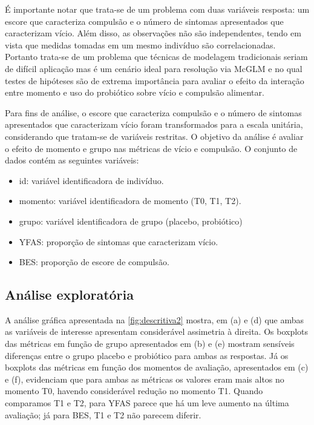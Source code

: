 É importante notar que trata-se de um problema com duas variáveis resposta: um escore que caracteriza compulsão e o número de sintomas apresentados que caracterizam vício. Além disso, as observações não são independentes, tendo em vista que medidas tomadas em um mesmo indivíduo são correlacionadas. Portanto trata-se de um problema que técnicas de modelagem tradicionais seriam de difícil aplicação mas é um cenário ideal para resolução via McGLM e no qual testes de hipóteses são de extrema importância para avaliar o efeito da interação entre momento e uso do probiótico sobre vício e compulsão alimentar.

Para fins de análise, o escore que caracteriza compulsão e o número de sintomas apresentados que caracterizam vício foram transformados para a escala unitária, considerando que tratam-se de variáveis restritas. O objetivo da análise é avaliar o efeito de momento e grupo nas métricas de vício e compulsão. O conjunto de dados contém as seguintes variáveis:

\begin{itemize}
  \item id: variável identificadora de indivíduo.
  \item momento: variável identificadora de momento (T0, T1, T2).
  \item grupo: variável identificadora de grupo (placebo, probiótico)
  \item YFAS: proporção de sintomas que caracterizam vício.
  \item BES: proporção de escore de compulsão.
\end{itemize}


\subsection{Análise exploratória}

A análise gráfica apresentada na \autoref{fig:descritiva2} mostra, em (a) e (d) que ambas as variáveis de interesse apresentam considerável assimetria à direita. Os boxplots das métricas em função de grupo apresentados em (b) e (e) mostram sensíveis diferenças entre o grupo placebo e probiótico para ambas as respostas. Já os boxplots das métricas em função dos momentos de avaliação, apresentados em (c) e (f), evidenciam que para ambas as métricas os valores eram mais altos no momento T0, havendo considerável redução no momento T1. Quando comparamos T1 e T2, para YFAS parece que há um leve aumento na última avaliação; já para BES, T1 e T2 não parecem diferir.

